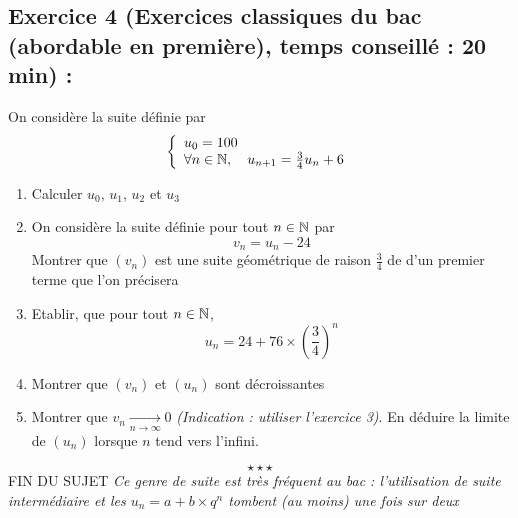 \subsection*{Exercice 4 (Exercices classiques du bac (abordable en première), temps conseillé : 20 min) : }
On considère la suite définie par 
$$\left\{\begin{array}{l}u_0 = 100 \\\forall n \in \mathbb{N}, \quad u_{n+1} = \frac{3}{4}u_n + 6\end{array}\right.$$
\begin{enumerate}
\item Calculer $u_0$, $u_1$, $u_2$ et $u_3$
\item On considère la suite définie pour tout $n\in \mathbb{N}$ par $$v_n = u_n - 24$$ Montrer que $(v_n)$ est une suite géométrique de raison $\frac{3}{4}$ de d'un premier terme que l'on précisera 
\item Etablir, que pour tout $n \in \mathbb{N}$, 
$$u_n = 24 + 76 \times \left(\frac{3}{4}\right)^n$$
\item Montrer que $(v_n)$ et $(u_n)$ sont décroissantes
\item Montrer que $v_n \underset{n\rightarrow \infty}{\longrightarrow} 0$ \emph{(Indication : utiliser l'exercice 3)}. En déduire la limite de $(u_n)$ lorsque $n$ tend vers l'infini.
\end{enumerate}
$$\star \star \star$$
\center
FIN DU SUJET
\flushleft
\emph{Ce genre de suite est très fréquent au bac : l'utilisation de suite intermédiaire et les $u_n = a + b\times q^n$ tombent (au moins) une fois sur deux}
